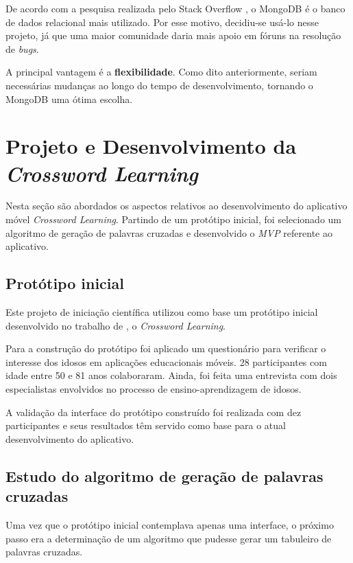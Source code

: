 De acordo com a pesquisa realizada pelo Stack Overflow \citep{stackoverflowmongo}, o MongoDB é o banco de dados relacional mais utilizado. Por esse motivo, decidiu-se usá-lo nesse projeto, já que uma maior comunidade daria mais apoio em fóruns na resolução de \textit{bugs}.

A principal vantagem é a \textbf{flexibilidade}. Como dito anteriormente, seriam necessárias mudanças ao longo do tempo de desenvolvimento, tornando o MongoDB uma ótima escolha.

\section{Projeto e Desenvolvimento da \textit{Crossword Learning}}
Nesta seção são abordados os aspectos relativos ao desenvolvimento do aplicativo móvel \textit{Crossword Learning}. Partindo de um protótipo inicial, foi selecionado um algoritmo de geração de palavras cruzadas e desenvolvido o \textit{MVP} referente ao aplicativo.

\subsection{Protótipo inicial}
\label{subsec:prototipoInicial}
Este projeto de iniciação científica utilizou como base um protótipo inicial desenvolvido no trabalho de \cite{oliveira2018crossword}, o \textit{Crossword Learning}.

Para a construção do protótipo foi aplicado um questionário para verificar o interesse dos idosos em aplicações educacionais móveis. 28 participantes com idade entre 50 e 81 anos colaboraram. Ainda, foi feita uma entrevista com dois especialistas envolvidos no processo de ensino-aprendizagem de idosos.

A validação da interface do protótipo construído foi realizada com dez participantes e seus resultados têm servido como base para o atual desenvolvimento do aplicativo. 


\subsection{Estudo do algoritmo de geração de palavras cruzadas}
Uma vez que o protótipo inicial contemplava apenas uma interface, o próximo passo era a determinação de um algoritmo que pudesse gerar um tabuleiro de palavras cruzadas. 

